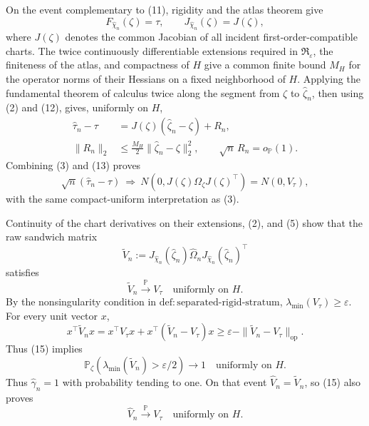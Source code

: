 On the event complementary to (11), rigidity and the atlas theorem give
\[
F_{\widehat\chi_n}(\zeta)=\tau,
\qquad
J_{\widehat\chi_n}(\zeta)=J(\zeta),
\tag{12}
\]
where \(J(\zeta)\) denotes the common Jacobian of all incident first-order-compatible charts.  The twice continuously differentiable extensions required in \(\mathfrak R_{\varepsilon}\), the finiteness of the atlas, and compactness of \(H\) give a common finite bound \(M_H\) for the operator norms of their Hessians on a fixed neighborhood of \(H\).  Applying the fundamental theorem of calculus twice along the segment from \(\zeta\) to \(\widehat\zeta_n\), then using (2) and (12), gives, uniformly on \(H\),
\[
\begin{aligned}
\widehat\tau_n-\tau
&=J(\zeta)(\widehat\zeta_n-\zeta)+R_n,\\
\|R_n\|_2
&\le \frac{M_H}{2}\|\widehat\zeta_n-\zeta\|_2^2,
\qquad
\sqrt n\,R_n=o_{\mathbb P}(1).
\end{aligned}
\tag{13}
\]
Combining (3) and (13) proves
\[
\sqrt n(\widehat\tau_n-\tau)
\ \Rightarrow\
N\!\left(0,J(\zeta)\Omega_{\zeta}J(\zeta)^\top\right)
=N(0,V_{\tau}),
\tag{14}
\]
with the same compact-uniform interpretation as (3).

Continuity of the chart derivatives on their extensions, (2), and (5) show that the raw sandwich matrix
\[
\widetilde V_n
:=
J_{\widehat\chi_n}(\widehat\zeta_n)
\widehat\Omega_n
J_{\widehat\chi_n}(\widehat\zeta_n)^\top
\]
satisfies
\[
\widetilde V_n\xrightarrow{\mathbb P}V_{\tau}
\quad\text{uniformly on }H.
\tag{15}
\]
By the nonsingularity condition in \(\mathrm{def:separated\text{-}rigid\text{-}stratum}\),
\(\lambda_{\min}(V_{\tau})\ge\varepsilon\).  For every unit vector \(x\),
\[
x^\top\widetilde V_nx
=x^\top V_{\tau}x+x^\top(\widetilde V_n-V_{\tau})x
\ge\varepsilon-\|\widetilde V_n-V_{\tau}\|_{\mathrm{op}}.
\]
Thus (15) implies
\[
\mathbb P_{\zeta}\!\left(
\lambda_{\min}(\widetilde V_n)>\varepsilon/2\right)\longrightarrow1
\quad\text{uniformly on }H.
\tag{16}
\]
Thus \(\widehat\gamma_n=1\) with probability tending to one.  On that event \(\widehat V_n=\widetilde V_n\), so (15) also proves
\[
\widehat V_n\xrightarrow{\mathbb P}V_{\tau}
\quad\text{uniformly on }H.
\tag{17}
\]

